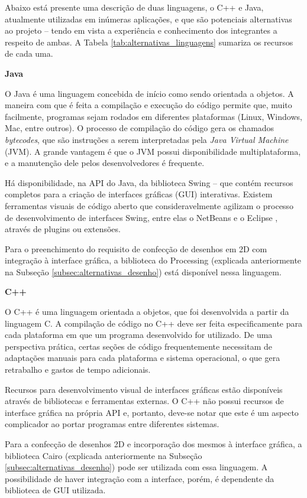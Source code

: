 Abaixo está presente uma descrição de duas linguagens, o C++ e Java, atualmente utilizadas em inúmeras aplicações, e que são potenciais alternativas ao projeto -- tendo em vista a experiência e conhecimento dos integrantes a respeito de ambas. A Tabela \ref{tab:alternativas_linguagens} sumariza os recursos de cada uma.

\textbf{Java}

O Java \cite{java} é uma linguagem concebida de início como sendo orientada a objetos. A maneira com que é feita a compilação e execução do código permite que, muito facilmente, programas sejam rodados em diferentes plataformas (Linux, Windows, Mac, entre outros). O processo de compilação do código gera os chamados \textit{bytecodes}, que são instruções a serem interpretadas pela \textit{Java Virtual Machine} (JVM). A grande vantagem é que o JVM possui disponibilidade multiplataforma, e a manutenção dele pelos desenvolvedores é frequente.

Há disponibilidade, na API do Java, da biblioteca Swing -- que contém recursos completos para a criação de interfaces gráficas (GUI) interativas. Existem ferramentas visuais de código aberto que consideravelmente agilizam o processo de desenvolvimento de interfaces Swing, entre elas o NetBeans \cite{netbeans} e o Eclipse \cite{eclipse}, através de plugins ou extensões. 

Para o preenchimento do requisito de confecção de desenhos em 2D com integração à interface gráfica, a biblioteca do Processing (explicada anteriormente na Subseção \ref{subsec:alternativas_desenho}) está disponível nessa linguagem.


\textbf{C++}

O C++ é uma linguagem orientada a objetos, que foi desenvolvida a partir da linguagem C. A compilação de código no C++ deve ser feita especificamente para cada plataforma em que um programa desenvolvido for utilizado. De uma perspectiva prática, certas seções de código frequentemente necessitam de adaptações manuais para cada plataforma e sistema operacional, o que gera retrabalho e gastos de tempo adicionais. 

Recursos para desenvolvimento visual de interfaces gráficas estão disponíveis através de bibliotecas e ferramentas externas. O C++ não possui recursos de interface gráfica na própria API e, portanto, deve-se notar que este é um aspecto complicador ao portar programas entre diferentes sistemas. 

Para a confecção de desenhos 2D e incorporação dos mesmos à interface gráfica, a biblioteca Cairo (explicada anteriormente na Subseção \ref{subsec:alternativas_desenho}) pode ser utilizada com essa linguagem. A possibilidade de haver integração com a interface, porém, é dependente da biblioteca de GUI utilizada.


